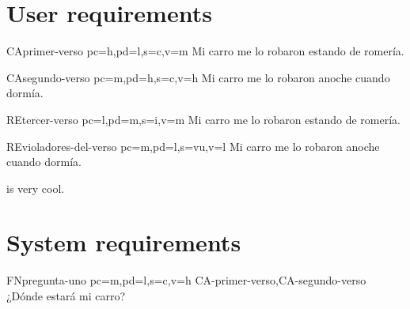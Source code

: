 \documentclass[a4paper,10pt]{article}
\begin{document}
  \section{User requirements}

  \printureqtemplate


  \begin{userReq}{CA}{primer-verso}
    {pc=h,pd=l,s=c,v=m}  %
    Mi carro me lo robaron estando de romería.
  \end{userReq}

  \begin{userReq}{CA}{segundo-verso}
    {pc=m,pd=h,s=c,v=h}  %
    Mi carro me lo robaron anoche cuando dormía.
  \end{userReq}


  \begin{userReq}{RE}{tercer-verso}
    {pc=l,pd=m,s=i,v=m}  %
    Mi carro me lo robaron estando de romería.
  \end{userReq}

  \begin{userReq}{RE}{violadores-del-verso}
    {pc=m,pd=l,s=vu,v=l}  %
    Mi carro me lo robaron anoche cuando dormía.
  \end{userReq}

  \FloatBarrier

   is very cool.



  \section{System requirements}

  \printsreqtemplate


  \begin{softwareReq}{FN}{pregunta-uno}
    {pc=m,pd=l,s=c,v=h}  %
    {CA-primer-verso,CA-segundo-verso}  %
    ¿Dónde estará mi carro?
  \end{softwareReq}
\end{document}
